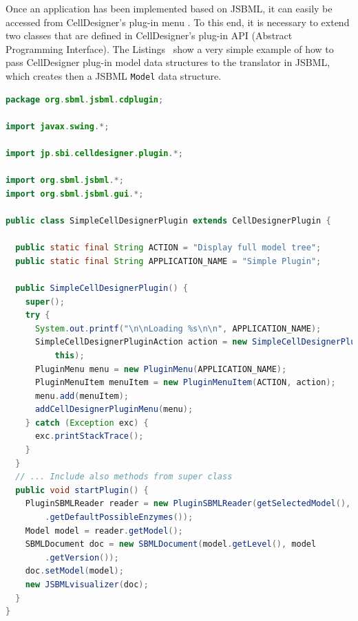 \documentclass[
  BCOR12mm,
  letterpaper,
  11pt,
  headsepline,
  pointlessnumbers,
  tablecaptionabove,
  headinclude,
  appendixprefix,
  idxtotoc,
  bibtotoc,
  twoside,
  titlepage
]{scrartcl}
\begin{document}
Once an application has been implemented based on JSBML, it can easily be
accessed from CellDesigner's plug-in menu \citep{Funahashi2003}. To this end,
it is necessary to extend two classes that are defined in CellDesigner's plug-in
API (Abstract Programming Interface). The
Listings~ show a very simple example of
how to pass CellDesigner plug-in model data structures to the translator in
JSBML, which creates then a JSBML \verb!Model! data structure.

% 
\begin{lstlisting}[language=Java,float,caption={A simple example for a
CellDesigner plug-in using JSBML as a communication layer},label=lst:Plugin]
package org.sbml.jsbml.cdplugin;

import javax.swing.*;

import jp.sbi.celldesigner.plugin.*;

import org.sbml.jsbml.*;
import org.sbml.jsbml.gui.*;

public class SimpleCellDesignerPlugin extends CellDesignerPlugin {

  public static final String ACTION = "Display full model tree";
  public static final String APPLICATION_NAME = "Simple Plugin";

  public SimpleCellDesignerPlugin() {
    super();
    try {
      System.out.printf("\n\nLoading %s\n\n", APPLICATION_NAME);
      SimpleCellDesignerPluginAction action = new SimpleCellDesignerPluginAction(
          this);
      PluginMenu menu = new PluginMenu(APPLICATION_NAME);
      PluginMenuItem menuItem = new PluginMenuItem(ACTION, action);
      menu.add(menuItem);
      addCellDesignerPluginMenu(menu);
    } catch (Exception exc) {
      exc.printStackTrace();
    }
  }
  // ... Include also methods from super class
  public void startPlugin() {
    PluginSBMLReader reader = new PluginSBMLReader(getSelectedModel(), SBO
        .getDefaultPossibleEnzymes());
    Model model = reader.getModel();
    SBMLDocument doc = new SBMLDocument(model.getLevel(), model
        .getVersion());
    doc.setModel(model);
    new JSBMLvisualizer(doc);
  }
}
\end{lstlisting}
\end{document}
